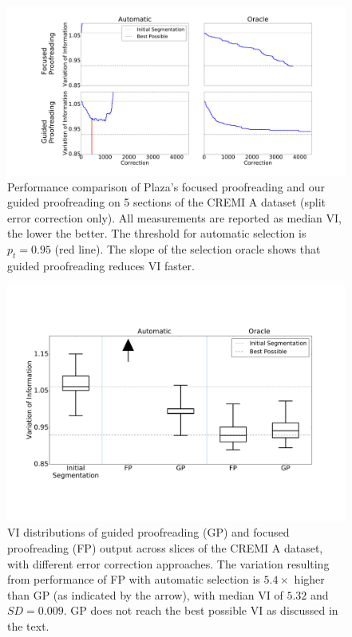 \begin{figure}[t]
\centering
\includegraphics[width=\linewidth]{gfx/cremiAtrails.pdf}
\caption{Performance comparison of Plaza's focused proofreading and our guided proofreading on 5 sections of the CREMI A dataset (split error correction only). All measurements are reported as median VI, the lower the better. The threshold for automatic selection is $p_t=0.95$ (red line). The slope of the selection oracle shows that guided proofreading reduces VI faster.}
\label{fig:cremiAtrails}
\end{figure}

\begin{figure}[t]
\centering
\includegraphics[width=\linewidth]{gfx/cremiAboxplot.pdf}
\caption{VI distributions of guided proofreading (GP) and focused proofreading (FP) output across slices of the CREMI A dataset, with different error correction approaches. The variation resulting from performance of FP with automatic selection is $5.4\times$ higher than GP (as indicated by the arrow), with median VI of $5.32$ and $SD=0.009$. GP does not reach the best possible VI as discussed in the text.}
\label{fig:cremiAboxplot}
\end{figure}


